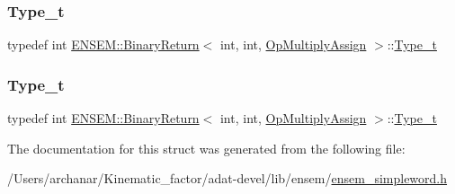 \mbox{\label{structENSEM_1_1BinaryReturn_3_01int_00_01int_00_01OpMultiplyAssign_01_4_a7a8dcc18d85fb6a01288cb15f4bc4cdf}} 
\subsubsection{\texorpdfstring{Type\_t}{Type\_t}\hspace{0.1cm}{\footnotesize\ttfamily [2/3]}}
{\footnotesize\ttfamily typedef int \mbox{\hyperlink{structENSEM_1_1BinaryReturn}{E\+N\+S\+E\+M\+::\+Binary\+Return}}$<$ int, int, \mbox{\hyperlink{structENSEM_1_1OpMultiplyAssign}{Op\+Multiply\+Assign}} $>$\+::\mbox{\hyperlink{structENSEM_1_1BinaryReturn_3_01int_00_01int_00_01OpMultiplyAssign_01_4_a7a8dcc18d85fb6a01288cb15f4bc4cdf}{Type\+\_\+t}}}

\mbox{\label{structENSEM_1_1BinaryReturn_3_01int_00_01int_00_01OpMultiplyAssign_01_4_a7a8dcc18d85fb6a01288cb15f4bc4cdf}} 
\subsubsection{\texorpdfstring{Type\_t}{Type\_t}\hspace{0.1cm}{\footnotesize\ttfamily [3/3]}}
{\footnotesize\ttfamily typedef int \mbox{\hyperlink{structENSEM_1_1BinaryReturn}{E\+N\+S\+E\+M\+::\+Binary\+Return}}$<$ int, int, \mbox{\hyperlink{structENSEM_1_1OpMultiplyAssign}{Op\+Multiply\+Assign}} $>$\+::\mbox{\hyperlink{structENSEM_1_1BinaryReturn_3_01int_00_01int_00_01OpMultiplyAssign_01_4_a7a8dcc18d85fb6a01288cb15f4bc4cdf}{Type\+\_\+t}}}



The documentation for this struct was generated from the following file\+:\begin{DoxyCompactItemize}
\item 
/\+Users/archanar/\+Kinematic\+\_\+factor/adat-\/devel/lib/ensem/\mbox{\hyperlink{adat-devel_2lib_2ensem_2ensem__simpleword_8h}{ensem\+\_\+simpleword.\+h}}\end{DoxyCompactItemize}

